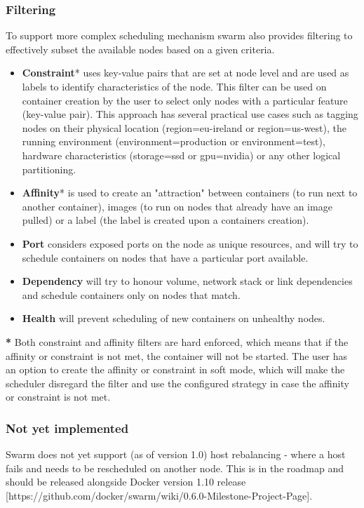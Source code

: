 \documentclass{article}
\begin{document}
\subsubsection{Filtering}
To support more complex scheduling mechanism swarm also provides filtering to effectively subset the available nodes based on a given criteria.
\begin{itemize}
\item \textbf{Constraint}* uses key-value pairs that are set at node level and are used as labels to identify characteristics of the node. This filter can be used on container creation by the user to select only nodes with a particular feature (key-value pair). This approach has several practical use cases such as tagging nodes on their physical location (region=eu-ireland or region=us-west), the running environment (environment=production or environment=test), hardware characteristics (storage=ssd or gpu=nvidia) or any other logical partitioning.
\item \textbf{Affinity}* is used to create an "attraction" between containers (to run next to another container), images (to run on nodes that already have an image pulled) or a label (the label is created upon a containers creation).
\item \textbf{Port} considers exposed ports on the node as unique resources, and will try to schedule containers on nodes that have a particular port available.
\item \textbf{Dependency} will try to honour volume, network stack or link dependencies and schedule containers only on nodes that match.
\item \textbf{Health} will prevent scheduling of new containers on unhealthy nodes.
\end{itemize}
\textbf{*} Both constraint and affinity filters are hard enforced, which means that if the affinity or constraint is not met, the container will not be started. The user has an option to create the affinity or constraint in soft mode, which will make the scheduler disregard the filter and use the configured strategy in case the affinity or constraint is not met.
\subsubsection{Not yet implemented}
Swarm does not yet support (as of version 1.0) host rebalancing - where a host fails and needs to be rescheduled on another node. This is in the roadmap and should be released alongside Docker version 1.10 release [https://github.com/docker/swarm/wiki/0.6.0-Milestone-Project-Page].
\end{document}
